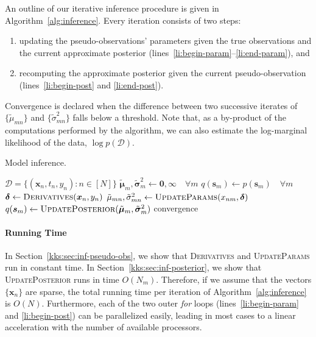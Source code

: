 An outline of our iterative inference procedure is given in Algorithm~\ref{alg:inference}.
Every iteration consists of two steps:
\begin{enumerate}
	\item updating the pseudo-observations' parameters given the true observations and the current approximate posterior (lines~\ref{li:begin-param}--\ref{li:end-param}), and
	\item recomputing the approximate posterior given the current pseudo-observation (lines~\ref{li:begin-post} and \ref{li:end-post}).
\end{enumerate}
Convergence is declared when the difference between two successive iterates of $\{ \tilde{\mu}_{mn} \}$ and $\{ \tilde{\sigma}_{mn}^2 \}$ falls below a threshold.
Note that, as a by-product of the computations performed by the algorithm, we can also estimate the log-marginal likelihood of the data, $\log p(\mathcal{D})$.

\begin{algorithm}[t]
	\caption{Model inference.}
	\label{alg:inference}
	\begin{algorithmic}[1]
		\Require $\mathcal{D} = \{ (\bm{x}_n, t_n, y_n) : n \in [N] \}$
		\State $\tilde{\bm{\mu}}_m, \tilde{\bm{\sigma}}^2_m \gets \bm{0}, \bm{\infty} \quad \forall m$
		\State $q(\bm{s}_m) \gets p(\bm{s}_m) \quad \forall m$
		\Repeat
		  \label{li:begin-param}
		\State $\bm{\delta} \gets \textsc{Derivatives}(\bm{x}_n, y_n)$ \label{li:derivatives}
		\State $\tilde{\mu}_{mn}, \tilde{\sigma}^2_{mn} \gets \textsc{UpdateParams}(x_{nm}, \bm{\delta})$ \label{li:updateparams}
		\EndFor
		\EndFor \label{li:end-param}
		 \label{li:begin-post}
		\State $q(\bm{s}_m) \gets \textsc{UpdatePosterior}(\tilde{\bm{\mu}}_m, \tilde{\bm{\sigma}}^2_m)$ \label{li:updateposterior}
		\EndFor \label{li:end-post}
		\Until convergence
	\end{algorithmic}
\end{algorithm}

\paragraph{Running Time}
In Section~\ref{kks:sec:inf-pseudo-obs}, we show that \textsc{Derivatives} and \textsc{UpdateParams} run in constant time.
In Section~\ref{kks:sec:inf-posterior}, we show that \textsc{UpdatePosterior} runs in time $O(N_m)$.
Therefore, if we assume that the vectors $\{ \bm{x}_n \}$ are sparse, the total running time per iteration of Algorithm~\ref{alg:inference} is $O(N)$.
Furthermore, each of the two outer \emph{for} loops (lines~\ref{li:begin-param} and \ref{li:begin-post}) can be parallelized easily, leading in most cases to a linear acceleration with the number of available processors.



